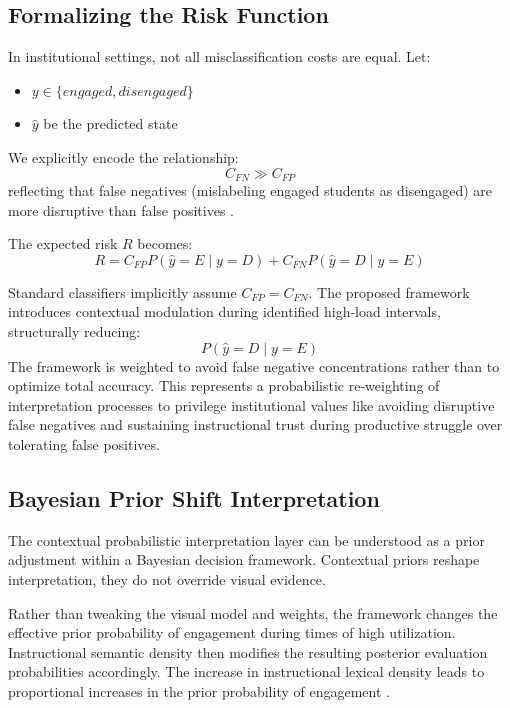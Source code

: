 \documentclass[conference]{IEEEtran}
\begin{document}
\subsection{Formalizing the Risk Function}
In institutional settings, not all misclassification costs are equal. Let:
\begin{itemize}
    \item $y \in \{engaged, disengaged\}$
    \item $\hat{y}$ be the predicted state
\end{itemize}

We explicitly encode the relationship:
\begin{equation}
C_{FN} \gg C_{FP}
\end{equation}
reflecting that false negatives (mislabeling engaged students as disengaged) are more disruptive than false positives \cite{b18}.

The expected risk $R$ becomes:
\begin{equation}
R = C_{FP} P(\hat{y}=E \mid y=D) + C_{FN} P(\hat{y}=D \mid y=E)
\end{equation}

Standard classifiers implicitly assume $C_{FP} = C_{FN}$. The proposed framework introduces contextual modulation during identified high-load intervals, structurally reducing:
\begin{equation}
P(\hat{y}=D \mid y=E)
\end{equation}
The framework is weighted to avoid false negative concentrations rather than to optimize total accuracy. This represents a probabilistic re-weighting of interpretation processes to privilege institutional values like avoiding disruptive false negatives and sustaining instructional trust during productive struggle over tolerating false positives.

\subsection{Bayesian Prior Shift Interpretation}

The contextual probabilistic interpretation layer can be understood as a prior adjustment within a Bayesian decision framework. Contextual priors reshape interpretation, they do not override visual evidence.

Rather than tweaking the visual model and weights, the framework changes the effective prior probability of engagement during times of high utilization. Instructional semantic density then modifies the resulting posterior evaluation probabilities accordingly. The increase in instructional lexical density leads to proportional increases in the prior probability of engagement \cite{b19}.
\end{document}
